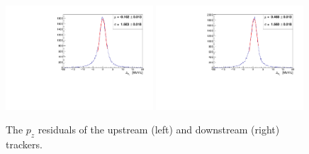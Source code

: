    \begin{figure}[p]
    \begin{center}
      \includegraphics[width=0.49\textwidth, angle=0]{08-Performance/upstream_pz_residual.pdf}
      \includegraphics[width=0.49\textwidth, angle=0]{08-Performance/downstream_pz_residual.pdf}
      \caption{\label{fig:PzResidKalman} The $p_z$ residuals of the upstream (left) and downstream (right) trackers.}
    \end{center}
  \end{figure}
  
  
